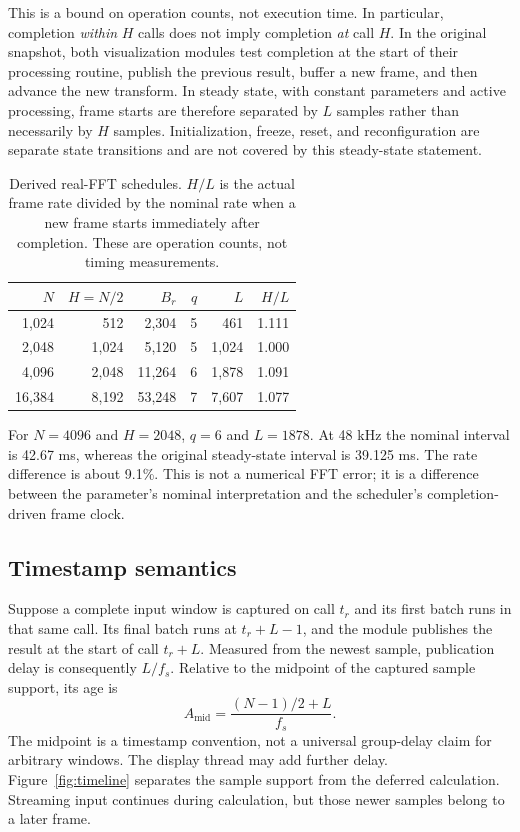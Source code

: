 \documentclass[11pt,letterpaper]{article}
\begin{document}
This is a bound on operation counts, not execution time. In particular,
completion \emph{within} $H$ calls does not imply completion \emph{at} call $H$.
In the original snapshot, both visualization modules test completion at the start of their processing
routine, publish the previous result, buffer a new frame, and then advance the
new transform. In steady state, with constant parameters and active processing,
frame starts are therefore separated by $L$ samples rather than necessarily by
$H$ samples. Initialization, freeze, reset, and reconfiguration are separate
state transitions and are not covered by this steady-state statement.

\begin{table}[tb]
\centering
\begin{tabular}{@{}rrrrrr@{}}
\toprule
$N$ & $H=N/2$ & $B_r$ & $q$ & $L$ & $H/L$ \\
\midrule
1,024 & 512 & 2,304 & 5 & 461 & 1.111 \\
2,048 & 1,024 & 5,120 & 5 & 1,024 & 1.000 \\
4,096 & 2,048 & 11,264 & 6 & 1,878 & 1.091 \\
16,384 & 8,192 & 53,248 & 7 & 7,607 & 1.077 \\
\bottomrule
\end{tabular}
\caption{Derived real-FFT schedules. $H/L$ is the actual frame rate divided by the nominal rate when a new frame starts immediately after completion. These are operation counts, not timing measurements.}
\label{tab:cadence}
\end{table}

For $N=4096$ and $H=2048$, $q=6$ and $L=1878$. At 48 kHz the nominal
interval is 42.67 ms, whereas the original steady-state interval is
39.125 ms. The rate difference is about 9.1\%. This is not a numerical FFT
error; it is a difference between the parameter's nominal interpretation and
the scheduler's completion-driven frame clock.

\subsection{Timestamp semantics}
Suppose a complete input window is captured on call $t_r$ and its first batch
runs in that same call. Its final batch runs at $t_r+L-1$, and the module
publishes the result at the start of call $t_r+L$. Measured from the newest
sample, publication delay is consequently $L/f_s$. Relative to the midpoint
of the captured sample support, its age is
\begin{equation}
 A_{\mathrm{mid}}=\frac{(N-1)/2+L}{f_s}.
 \label{eq:age}
\end{equation}
The midpoint is a timestamp convention, not a universal group-delay claim for
arbitrary windows. The display thread may add further delay. Figure~\ref{fig:timeline}
separates the sample support from the deferred calculation. Streaming input
continues during calculation, but those newer samples belong to a later frame.
\end{document}
